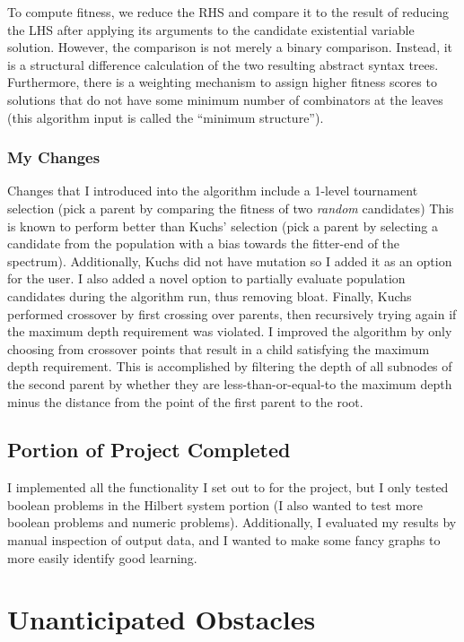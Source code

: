 \documentclass{article}
\begin{document}
To compute fitness, we reduce the RHS and compare it to the result of
reducing the LHS after applying its arguments to the candidate
existential variable solution. However, the comparison is not merely a
binary comparison. Instead, it is a structural difference calculation
of the two resulting abstract syntax trees. Furthermore, there is a
weighting mechanism to assign higher fitness scores to solutions that
do not have some minimum number of combinators at the leaves (this
algorithm input is called the ``minimum structure'').

\subsubsection{My Changes}

Changes that I introduced into the algorithm include a 1-level
tournament selection (pick a parent by comparing the fitness of two
\textit{random} candidates)
This is known to perform better than Kuchs' selection (pick a parent
by selecting a candidate from the population with a bias towards the
fitter-end of the spectrum).
Additionally, Kuchs did not have mutation so I added it as an option
for the user.
I also added a novel option to partially evaluate population
candidates during the algorithm run, thus removing bloat. Finally,
Kuchs performed crossover by first crossing over parents, then
recursively trying again if the maximum depth requirement was
violated. I improved the algorithm by only choosing from crossover
points that result in a child satisfying the maximum depth
requirement. This is accomplished by filtering the depth of all
subnodes of the second parent by whether they are
less-than-or-equal-to the maximum depth minus the distance from the
point of the first parent to the root.

\subsection{Portion of Project Completed}

I implemented all the functionality I set out to for the project, but
I only tested boolean problems in the Hilbert system portion (I also wanted to
test more boolean problems and numeric problems). Additionally, I
evaluated my results by manual inspection of output data, and I wanted
to make some fancy graphs to more easily identify good learning.

\section{Unanticipated Obstacles}
\end{document}
